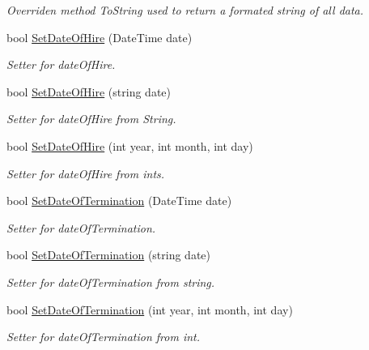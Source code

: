 \begin{DoxyCompactItemize}
\begin{DoxyCompactList}\small\item\em Overriden method To\+String used to return a formated string of all data. \end{DoxyCompactList}\item 
bool \hyperlink{class_all_employees_1_1_fulltime_employee_aaf2dc1dcb158819d06958d4399850f56}{Set\+Date\+Of\+Hire} (Date\+Time date)
\begin{DoxyCompactList}\small\item\em Setter for date\+Of\+Hire. \end{DoxyCompactList}\item 
bool \hyperlink{class_all_employees_1_1_fulltime_employee_a6b7516d71f46e650da2200a308d6f226}{Set\+Date\+Of\+Hire} (string date)
\begin{DoxyCompactList}\small\item\em Setter for date\+Of\+Hire from String. \end{DoxyCompactList}\item 
bool \hyperlink{class_all_employees_1_1_fulltime_employee_ae5612c076ead69a3b6f0bbc22a21e293}{Set\+Date\+Of\+Hire} (int year, int month, int day)
\begin{DoxyCompactList}\small\item\em Setter for date\+Of\+Hire from ints. \end{DoxyCompactList}\item 
bool \hyperlink{class_all_employees_1_1_fulltime_employee_a94e9d4b67b20ecbe1449701a200b1c07}{Set\+Date\+Of\+Termination} (Date\+Time date)
\begin{DoxyCompactList}\small\item\em Setter for date\+Of\+Termination. \end{DoxyCompactList}\item 
bool \hyperlink{class_all_employees_1_1_fulltime_employee_a7d142370fe7f81bd623de155a80d0214}{Set\+Date\+Of\+Termination} (string date)
\begin{DoxyCompactList}\small\item\em Setter for date\+Of\+Termination from string. \end{DoxyCompactList}\item 
bool \hyperlink{class_all_employees_1_1_fulltime_employee_aed4ff527256f96b542d0ac0c17f3e2ea}{Set\+Date\+Of\+Termination} (int year, int month, int day)
\begin{DoxyCompactList}\small\item\em Setter for date\+Of\+Termination from int. \end{DoxyCompactList}\item 

\end{DoxyCompactItemize}
